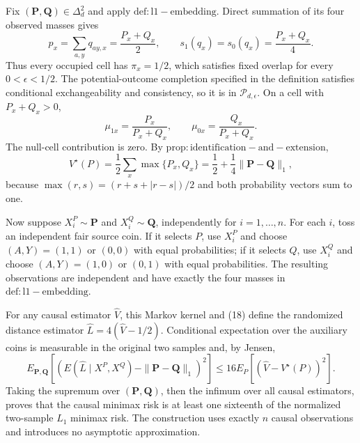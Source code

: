 Fix \((\mathbf P,\mathbf Q)\in\Delta_d^2\) and apply \(\mathrm{def:l1-embedding}\).  Direct summation of its four observed masses gives
\[
 p_x=\sum_{a,y}q_{ay,x}=\frac{P_x+Q_x}{2},\qquad
 s_1(q_x)=s_0(q_x)=\frac{P_x+Q_x}{4}.
\]
Thus every occupied cell has \(\pi_x=1/2\), which satisfies fixed overlap for every \(0<\epsilon<1/2\).  The potential-outcome completion specified in the definition satisfies conditional exchangeability and consistency, so it is in \(\mathcal P_{d,\epsilon}\).  On a cell with \(P_x+Q_x>0\),
\[
 \mu_{1x}=\frac{P_x}{P_x+Q_x},\qquad
 \mu_{0x}=\frac{Q_x}{P_x+Q_x}.
\]
The null-cell contribution is zero.  By \(\mathrm{prop:identification-and-extension}\),
\[
 V^\star(P)=\frac12\sum_x\max\{P_x,Q_x\}
 =\frac12+\frac14\|\mathbf P-\mathbf Q\|_1,                         \tag{18}
\]
because \(\max(r,s)=(r+s+|r-s|)/2\) and both probability vectors sum to one.

Now suppose \(X_i^P\sim\mathbf P\) and \(X_i^Q\sim\mathbf Q\), independently for \(i=1,\ldots,n\).  For each \(i\), toss an independent fair source coin.  If it selects \(P\), use \(X_i^P\) and choose \((A,Y)=(1,1)\) or \((0,0)\) with equal probabilities; if it selects \(Q\), use \(X_i^Q\) and choose \((A,Y)=(1,0)\) or \((0,1)\) with equal probabilities.  The resulting observations are independent and have exactly the four masses in \(\mathrm{def:l1-embedding}\).

For any causal estimator \(\widehat V\), this Markov kernel and (18) define the randomized distance estimator \(\widehat L=4(\widehat V-1/2)\).  Conditional expectation over the auxiliary coins is measurable in the original two samples and, by Jensen,
\[
 E_{\mathbf P,\mathbf Q}\left[(E(\widehat L\mid X^P,X^Q)-\|\mathbf P-\mathbf Q\|_1)^2\right]
 \leq16E_P[(\widehat V-V^\star(P))^2].
\]
Taking the supremum over \((\mathbf P,\mathbf Q)\), then the infimum over all causal estimators, proves that the causal minimax risk is at least one sixteenth of the normalized two-sample \(L_1\) minimax risk.  The construction uses exactly \(n\) causal observations and introduces no asymptotic approximation.